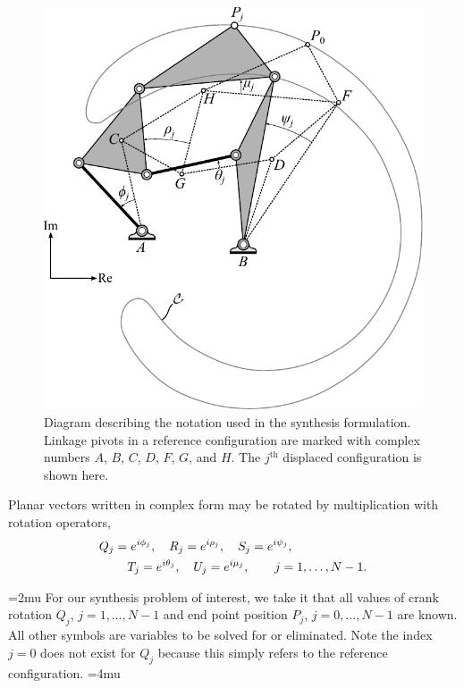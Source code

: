 \documentclass[journal]{IEEEtran}
\begin{document}
\begin{figure}[!b]
\centering
\includegraphics[width=1\linewidth]{synthesis_diagram}
\caption{Diagram describing the notation used in the synthesis formulation.  Linkage pivots in a reference configuration are marked with complex numbers $A$, $B$, $C$, $D$, $F$, $G$, and $H$.  The $j^\text{th}$ displaced configuration is shown here.}
\label{synthesis_diagram}
\end{figure}



Planar vectors written in complex form may be rotated by multiplication with rotation operators,
\begin{align}
&Q_j = e^{i\phi_j}, \quad R_j = e^{i\rho_j}, \quad S_j = e^{i\psi_j}, \nonumber\\
&\hspace{8mm} T_j = e^{i\theta_j}, \quad U_j = e^{i\mu_j}, \qquad j=1,\ldots,N-1.
\end{align}

\medmuskip=2mu
For our synthesis problem of interest, we take it that all values of crank rotation $Q_j$, $j=1,\ldots,N-1$ and end point position $P_j$, $j=0,\ldots,N-1$ are known.  All other symbols are variables to be solved for or eliminated.  Note the index $j=0$ does not exist for $Q_j$ because this simply refers to the reference configuration.
\medmuskip=4mu
\end{document}
